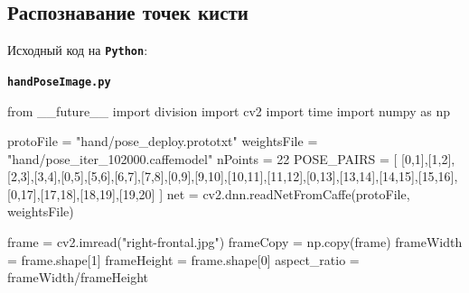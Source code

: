 \documentclass[
  12pt,
  a4paper,
]{article}
\newenvironment{Shaded}{}{}
\newcommand{\DecValTok}[1]{\textcolor[rgb]{0.25,0.63,0.44}{#1}}
\newcommand{\ImportTok}[1]{#1}
\newcommand{\NormalTok}[1]{#1}
\newcommand{\OperatorTok}[1]{\textcolor[rgb]{0.40,0.40,0.40}{#1}}
\newcommand{\StringTok}[1]{\textcolor[rgb]{0.25,0.44,0.63}{#1}}
\begin{document}
\hypertarget{ux440ux430ux441ux43fux43eux437ux43dux430ux432ux430ux43dux438ux435-ux442ux43eux447ux435ux43a-ux43aux438ux441ux442ux438}{%
\subsection{Распознавание точек
кисти}\label{ux440ux430ux441ux43fux43eux437ux43dux430ux432ux430ux43dux438ux435-ux442ux43eux447ux435ux43a-ux43aux438ux441ux442ux438}}

Исходный код на \textbf{\texttt{Python}}:

\textbf{\texttt{handPoseImage.py}}

\begin{Shaded}
\begin{Highlighting}[numbers=left,,]
\ImportTok{from}\NormalTok{ \_\_future\_\_ }\ImportTok{import}\NormalTok{ division}
\ImportTok{import}\NormalTok{ cv2}
\ImportTok{import}\NormalTok{ time}
\ImportTok{import}\NormalTok{ numpy }\ImportTok{as}\NormalTok{ np}

\NormalTok{protoFile }\OperatorTok{=} \StringTok{"hand/pose\_deploy.prototxt"}
\NormalTok{weightsFile }\OperatorTok{=} \StringTok{"hand/pose\_iter\_102000.caffemodel"}
\NormalTok{nPoints }\OperatorTok{=} \DecValTok{22}
\NormalTok{POSE\_PAIRS }\OperatorTok{=}\NormalTok{ [ [}\DecValTok{0}\NormalTok{,}\DecValTok{1}\NormalTok{],[}\DecValTok{1}\NormalTok{,}\DecValTok{2}\NormalTok{],[}\DecValTok{2}\NormalTok{,}\DecValTok{3}\NormalTok{],[}\DecValTok{3}\NormalTok{,}\DecValTok{4}\NormalTok{],[}\DecValTok{0}\NormalTok{,}\DecValTok{5}\NormalTok{],[}\DecValTok{5}\NormalTok{,}\DecValTok{6}\NormalTok{],[}\DecValTok{6}\NormalTok{,}\DecValTok{7}\NormalTok{],[}\DecValTok{7}\NormalTok{,}\DecValTok{8}\NormalTok{],[}\DecValTok{0}\NormalTok{,}\DecValTok{9}\NormalTok{],[}\DecValTok{9}\NormalTok{,}\DecValTok{10}\NormalTok{],[}\DecValTok{10}\NormalTok{,}\DecValTok{11}\NormalTok{],[}\DecValTok{11}\NormalTok{,}\DecValTok{12}\NormalTok{],[}\DecValTok{0}\NormalTok{,}\DecValTok{13}\NormalTok{],[}\DecValTok{13}\NormalTok{,}\DecValTok{14}\NormalTok{],[}\DecValTok{14}\NormalTok{,}\DecValTok{15}\NormalTok{],[}\DecValTok{15}\NormalTok{,}\DecValTok{16}\NormalTok{],[}\DecValTok{0}\NormalTok{,}\DecValTok{17}\NormalTok{],[}\DecValTok{17}\NormalTok{,}\DecValTok{18}\NormalTok{],[}\DecValTok{18}\NormalTok{,}\DecValTok{19}\NormalTok{],[}\DecValTok{19}\NormalTok{,}\DecValTok{20}\NormalTok{] ]}
\NormalTok{net }\OperatorTok{=}\NormalTok{ cv2.dnn.readNetFromCaffe(protoFile, weightsFile)}

\NormalTok{frame }\OperatorTok{=}\NormalTok{ cv2.imread(}\StringTok{"right{-}frontal.jpg"}\NormalTok{)}
\NormalTok{frameCopy }\OperatorTok{=}\NormalTok{ np.copy(frame)}
\NormalTok{frameWidth }\OperatorTok{=}\NormalTok{ frame.shape[}\DecValTok{1}\NormalTok{]}
\NormalTok{frameHeight }\OperatorTok{=}\NormalTok{ frame.shape[}\DecValTok{0}\NormalTok{]}
\NormalTok{aspect\_ratio }\OperatorTok{=}\NormalTok{ frameWidth}\OperatorTok{/}\NormalTok{frameHeight}


\end{Highlighting}
\end{Shaded}
\end{document}

